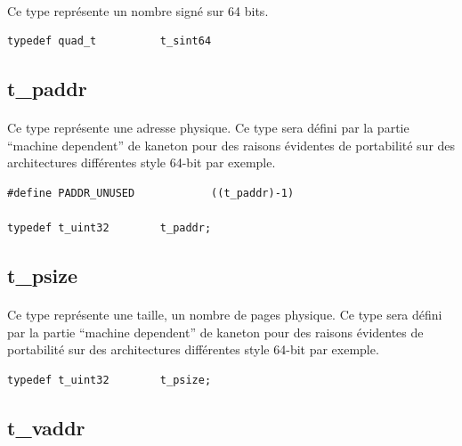 \documentclass[10pt,a4wide]{article}
\begin{document}
\paragraph{}

Ce type repr\'esente un nombre sign\'e sur 64 bits.

\begin{verbatim}
typedef quad_t          t_sint64
\end{verbatim}

\subsection{t\_paddr}

\paragraph{}

Ce type repr\'esente une adresse physique. Ce type sera d\'efini par la
partie ``machine dependent'' de kaneton pour des raisons \'evidentes de
portabilit\'e sur des architectures diff\'erentes style 64-bit par exemple.

\begin{verbatim}
#define PADDR_UNUSED            ((t_paddr)-1)

typedef t_uint32        t_paddr;
\end{verbatim}

\subsection{t\_psize}

\paragraph{}

Ce type repr\'esente une taille, un nombre de pages physique. Ce type
sera d\'efini par la partie ``machine dependent'' de kaneton pour des
raisons \'evidentes de portabilit\'e sur des architectures diff\'erentes
style 64-bit par exemple.

\begin{verbatim}
typedef t_uint32        t_psize;
\end{verbatim}

\subsection{t\_vaddr}

\paragraph{}
\end{document}
